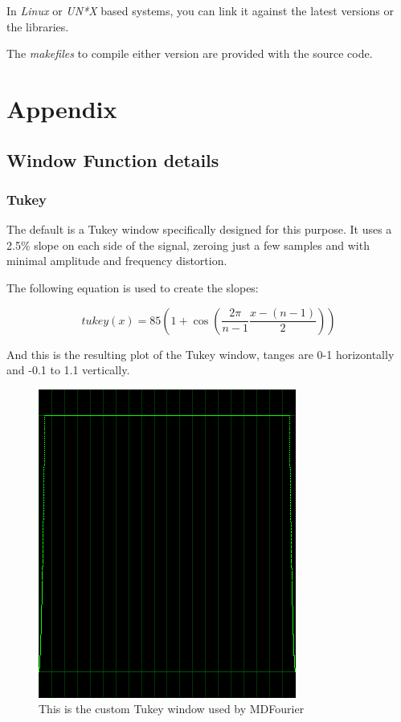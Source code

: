 \documentclass[10pt,a4paper]{report}
\begin{document}
In \textit{Linux} or \textit{UN*X} based systems, you can link it against the latest versions or the libraries.

The \textit{makefiles} to compile either version are provided with the source code\cite{sourcecode}.

\chapter{Appendix}

\section{Window Function details}
\label{windowfunctiondetails}

\subsection{Tukey}

The default is a Tukey window specifically designed for this purpose. It uses a 2.5\% slope on each side of the signal, zeroing just a few samples and with minimal amplitude and frequency distortion.

The following equation is used to create the slopes:

\begin{equation}
tukey(x)=85(1+\cos(\frac{2\pi}{n-1}\frac{x-(n-1)}{2}))
\end{equation}

And this is the resulting plot of the Tukey window, tanges are 0-1 horizontally and -0.1 to 1.1 vertically.

\begin{figure}[H]
	\centering
	\includegraphics[width=0.4\linewidth]{plots/window-tukey.png}
	\caption[Tukey Window]{This is the custom Tukey window used by MDFourier}
	\label{fig:window-tukey}
\end{figure}
\end{document}
